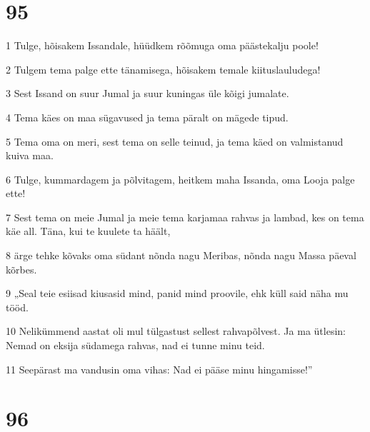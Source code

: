 \chapter{95}

\par 1 Tulge, hõisakem Issandale, hüüdkem rõõmuga oma päästekalju poole!
\par 2 Tulgem tema palge ette tänamisega, hõisakem temale kiituslauludega!
\par 3 Sest Issand on suur Jumal ja suur kuningas üle kõigi jumalate.
\par 4 Tema käes on maa sügavused ja tema päralt on mägede tipud.
\par 5 Tema oma on meri, sest tema on selle teinud, ja tema käed on valmistanud kuiva maa.
\par 6 Tulge, kummardagem ja põlvitagem, heitkem maha Issanda, oma Looja palge ette!
\par 7 Sest tema on meie Jumal ja meie tema karjamaa rahvas ja lambad, kes on tema käe all. Täna, kui te kuulete ta häält,
\par 8 ärge tehke kõvaks oma südant nõnda nagu Meribas, nõnda nagu Massa päeval kõrbes.
\par 9 „Seal teie esiisad kiusasid mind, panid mind proovile, ehk küll said näha mu tööd.
\par 10 Nelikümmend aastat oli mul tülgastust sellest rahvapõlvest. Ja ma ütlesin: Nemad on eksija südamega rahvas, nad ei tunne minu teid.
\par 11 Seepärast ma vandusin oma vihas: Nad ei pääse minu hingamisse!”

\chapter{96}

